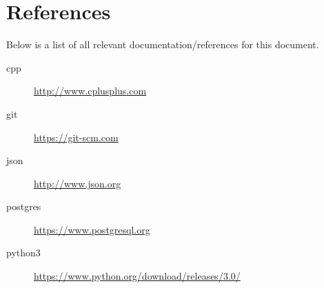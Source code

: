 \chapter{References}
Below is a list of all relevant documentation/references for this document.

\begin{description}
    \item[\gls{cpp}] \url{http://www.cplusplus.com}
    \item[\gls{git}] \url{https://git-scm.com}
    \item[\gls{json}] \url{http://www.json.org}
    \item[\gls{postgres}] \url{https://www.postgresql.org}
    \item[\gls{python}3] \url{https://www.python.org/download/releases/3.0/}
\end{description}
